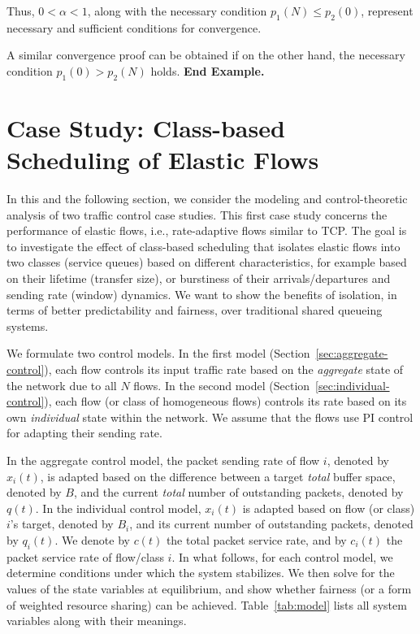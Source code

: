 \documentclass{article}
\begin{document}
Thus, $0 < \alpha < 1$, along with the necessary condition $p_1(N) \leq p_2(0)$,
represent necessary and sufficient conditions for convergence.

A similar convergence proof can be obtained if on the other hand, the necessary condition $p_1(0) > p_2(N)$ holds.
{\bf End Example.}

\section{Case Study: Class-based Scheduling of Elastic Flows}
\label{sec:case1}

In this and the following section, 
we consider the modeling and control-theoretic analysis of two traffic control case studies. 
This first case study \cite{MattaGuo:icnp00,GuoMatta:icnp01} 
concerns the performance of elastic  flows, i.e., rate-adaptive flows similar to TCP.
The goal is to investigate the effect of class-based scheduling
that isolates elastic flows into two classes (service queues) based on different characteristics,
for example based on their lifetime (transfer size), 
or burstiness of their arrivals/departures and
sending rate (window) dynamics.
We want to show the benefits of isolation,
in terms of better predictability and fairness,
over traditional shared queueing systems.

We formulate 
two control models.
In the first model (Section~\ref{sec:aggregate-control}),
each flow controls its input traffic rate
based on the {\em aggregate} state of the network
due to all $N$ flows.
In the second model (Section~\ref{sec:individual-control}),
each flow  (or class of
homogeneous flows) controls its rate based
on its own {\em individual} state within the network.
We assume that the flows use PI control for adapting their sending rate.

In the aggregate control model,
the packet sending rate of flow $i$,
denoted by $x_i(t)$, is adapted based
on the difference between a target {\em total} buffer space,
denoted by $B$, 
and the current {\em total} number of outstanding packets,
denoted by $q(t)$.
In the individual control model,
$x_i(t)$ is adapted based on
flow (or class) $i$'s target, denoted by $B_i$,
and its current number of outstanding packets,
denoted by $q_i(t)$.
We denote by $c(t)$
the total packet service rate,
and by $c_i(t)$
the packet service rate of flow/class $i$.
In what follows,
for each control model,
we determine conditions under which
the system stabilizes.
We then solve for the values of the state variables
at equilibrium, and show whether fairness
(or a form of weighted resource sharing) can be achieved.
Table~\ref{tab:model} lists all system variables
along with their meanings.
\end{document}
